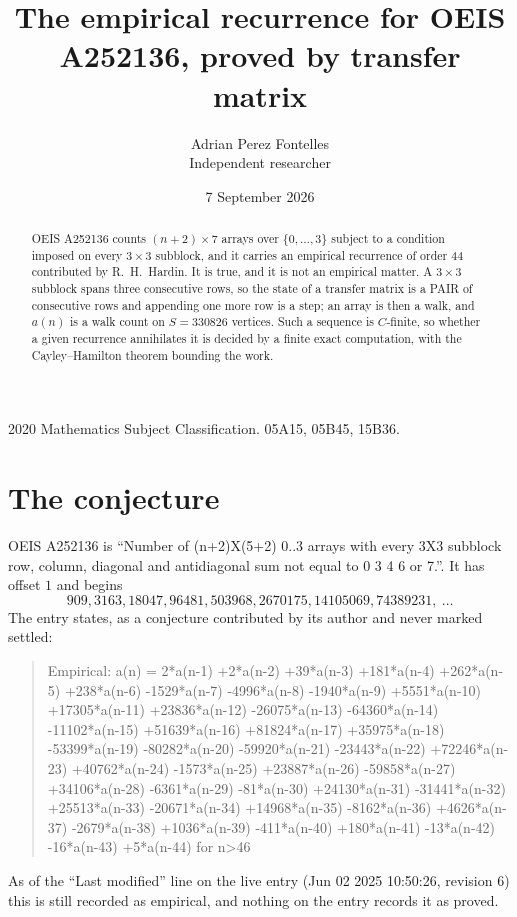 \documentclass[11pt,a4paper]{article}
\title{The empirical recurrence for OEIS A252136, proved by transfer matrix}
\author{Adrian Perez Fontelles\\ \small Independent researcher}
\date{7 September 2026}
\theoremstyle{plain}
\theoremstyle{definition}
\begin{document}
\maketitle

\begin{abstract}
OEIS A252136 counts $(n+2)\times7$ arrays over $\{0,\dots,3\}$ subject to a condition imposed on
every $3\times3$ subblock, and it carries an empirical recurrence of order $44$
contributed by R.~H.~Hardin. It is true, and it is not an empirical matter. A $3\times3$
subblock spans three consecutive rows, so the state of a transfer matrix is a PAIR of
consecutive rows and appending one more row is a step; an array is then a walk, and
$a(n)$ is a walk count on $S=330826$ vertices. Such a sequence is $C$-finite, so whether a given
recurrence annihilates it is decided by a finite exact computation, with the Cayley--Hamilton
theorem bounding the work.
\end{abstract}

\noindent\small 2020 Mathematics Subject Classification. 05A15, 05B45, 15B36.\normalsize

\section{The conjecture}

OEIS A252136 is ``Number of (n+2)X(5+2) 0..3 arrays with every 3X3 subblock row, column, diagonal and antidiagonal sum not equal to 0 3 4 6 or 7.''. It has offset $1$ and begins
\[
909, 3163, 18047, 96481, 503968, 2670175, 14105069, 74389231,\ \dots
\]
The entry states, as a conjecture contributed by its author and never marked settled:
\begin{quote}
Empirical: a(n) = 2*a(n-1) +2*a(n-2) +39*a(n-3) +181*a(n-4) +262*a(n-5) +238*a(n-6) -1529*a(n-7) -4996*a(n-8) -1940*a(n-9) +5551*a(n-10) +17305*a(n-11) +23836*a(n-12) -26075*a(n-13) -64360*a(n-14) -11102*a(n-15) +51639*a(n-16) +81824*a(n-17) +35975*a(n-18) -53399*a(n-19) -80282*a(n-20) -59920*a(n-21) -23443*a(n-22) +72246*a(n-23) +40762*a(n-24) -1573*a(n-25) +23887*a(n-26) -59858*a(n-27) +34106*a(n-28) -6361*a(n-29) -81*a(n-30) +24130*a(n-31) -31441*a(n-32) +25513*a(n-33) -20671*a(n-34) +14968*a(n-35) -8162*a(n-36) +4626*a(n-37) -2679*a(n-38) +1036*a(n-39) -411*a(n-40) +180*a(n-41) -13*a(n-42) -16*a(n-43) +5*a(n-44) for n>46
\end{quote}
As of the ``Last modified'' line on the live entry (Jun 02 2025 10:50:26, revision 6) this is still
recorded as empirical, and nothing on the entry records it as proved.
\end{document}
